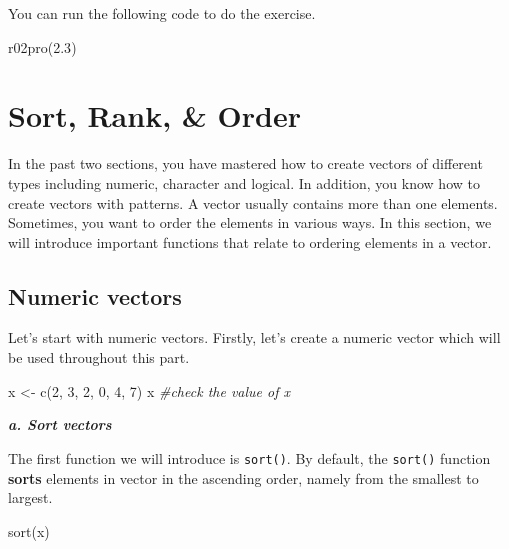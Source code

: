 \documentclass[
]{book}
\newenvironment{Shaded}{\begin{snugshade}}{\end{snugshade}}
\newcommand{\CommentTok}[1]{\textcolor[rgb]{0.56,0.35,0.01}{\textit{#1}}}
\newcommand{\DecValTok}[1]{\textcolor[rgb]{0.00,0.00,0.81}{#1}}
\newcommand{\FloatTok}[1]{\textcolor[rgb]{0.00,0.00,0.81}{#1}}
\newcommand{\FunctionTok}[1]{\textcolor[rgb]{0.00,0.00,0.00}{#1}}
\newcommand{\NormalTok}[1]{#1}
\newcommand{\OtherTok}[1]{\textcolor[rgb]{0.56,0.35,0.01}{#1}}
\begin{document}
You can run the following code to do the exercise.

\begin{Shaded}
\begin{Highlighting}[]
\FunctionTok{r02pro}\NormalTok{(}\FloatTok{2.3}\NormalTok{)}
\end{Highlighting}
\end{Shaded}

\hypertarget{sort-vector}{%
\section{Sort, Rank, \& Order}\label{sort-vector}}

In the past two sections, you have mastered how to create vectors of different types including numeric, character and logical. In addition, you know how to create vectors with patterns. A vector usually contains more than one elements. Sometimes, you want to order the elements in various ways. In this section, we will introduce important functions that relate to ordering elements in a vector.

\hypertarget{numeric-vectors}{%
\subsection{Numeric vectors}\label{numeric-vectors}}

Let's start with numeric vectors. Firstly, let's create a numeric vector which will be used throughout this part.

\begin{Shaded}
\begin{Highlighting}[]
\NormalTok{x }\OtherTok{\textless{}{-}} \FunctionTok{c}\NormalTok{(}\DecValTok{2}\NormalTok{, }\DecValTok{3}\NormalTok{, }\DecValTok{2}\NormalTok{, }\DecValTok{0}\NormalTok{, }\DecValTok{4}\NormalTok{, }\DecValTok{7}\NormalTok{) }
\NormalTok{x }\CommentTok{\#check the value of x}
\end{Highlighting}
\end{Shaded}

\textbf{\emph{a. Sort vectors}}

The first function we will introduce is \texttt{sort()}. By default, the \texttt{sort()} function \textbf{sorts} elements in vector in the ascending order, namely from the smallest to largest.

\begin{Shaded}
\begin{Highlighting}[]
\FunctionTok{sort}\NormalTok{(x)}
\end{Highlighting}
\end{Shaded}
\end{document}
